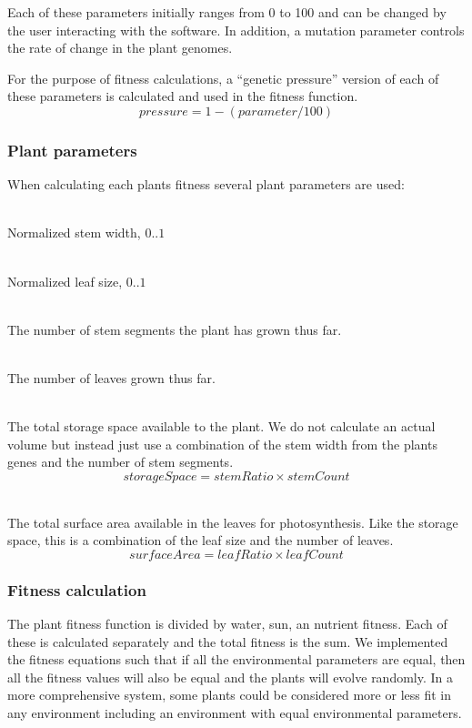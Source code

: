 \documentclass[conference]{acmsiggraph}
\begin{document}
Each of these parameters initially ranges from 0 to 100 and can be changed by
the user interacting with the software. In addition, a mutation parameter
controls the rate of change in the plant genomes.

For the purpose of fitness calculations, a ``genetic pressure'' version of each
of these parameters is calculated and used in the fitness function.
\[pressure = 1 - (parameter / 100)\]

\subsubsection{Plant parameters}

When calculating each plants fitness several plant parameters are used:

\begin{description}[leftmargin=!,labelindent=0.2in,labelwidth=0.1in]
  \item[Stem ratio]    \hfill \\
    Normalized stem width, $0 .. 1$
  \item[Leaf ratio]    \hfill \\
    Normalized leaf size, $0 .. 1$
  \item[Stem count]    \hfill \\
    The number of stem segments the plant has grown thus far.
  \item[Leaf count]    \hfill \\
    The number of leaves grown thus far.
  \item[Storage space] \hfill \\
    The total storage space available to the plant. We do not calculate an
    actual volume but instead just use a combination of the stem width from the
    plants genes and the number of stem segments.
    \[ storageSpace = stemRatio \times stemCount \]
  \item[Surface area]  \hfill \\
    The total surface area available in the leaves for photosynthesis. Like the
    storage space, this is a combination of the leaf size and the number of
    leaves.
    \[ surfaceArea = leafRatio \times leafCount \]
\end{description}

\subsubsection{Fitness calculation}

The plant fitness function is divided by water, sun, an nutrient fitness. Each
of these is calculated separately and the total fitness is the sum. We
implemented the fitness equations such that if all the environmental parameters
are equal, then all the fitness values will also be equal and the plants will
evolve randomly. In a more comprehensive system, some plants could be considered
more or less fit in any environment including an environment with equal
environmental parameters.
\end{document}
